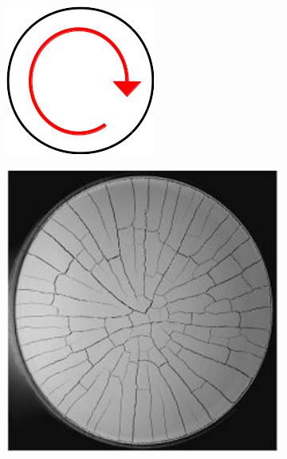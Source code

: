 \begin{figure}[htb!]
    \begin{subfigure}{0.18\textwidth}
        \includegraphics[width=\textwidth]{past/figures/radial_schematic.png}
    \end{subfigure}
    \begin{subfigure}{0.18\textwidth}
        \includegraphics[width=\textwidth]{past/figures/paste_radial.png}

\end{subfigure}
\end{figure}
